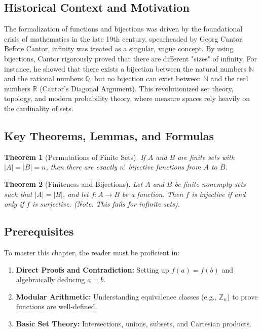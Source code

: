 \documentclass[11pt, a4paper]{article}
\newtheorem{theorem}{Theorem}[section]
\theoremstyle{definition}
\theoremstyle{remark}
\newcommand{\R}{\mathbb{R}}
\newcommand{\N}{\mathbb{N}}
\newcommand{\Z}{\mathbb{Z}}
\newcommand{\Q}{\mathbb{Q}}
\begin{document}
\subsection{Historical Context and Motivation}
The formalization of functions and bijections was driven by the foundational crisis of mathematics in the late 19th century, spearheaded by Georg Cantor. Before Cantor, infinity was treated as a singular, vague concept. By using bijections, Cantor rigorously proved that there are different "sizes" of infinity. For instance, he showed that there exists a bijection between the natural numbers $\N$ and the rational numbers $\Q$, but no bijection can exist between $\N$ and the real numbers $\R$ (Cantor's Diagonal Argument). This revolutionized set theory, topology, and modern probability theory, where measure spaces rely heavily on the cardinality of sets.

\subsection{Key Theorems, Lemmas, and Formulas}
\begin{theorem}[Permutations of Finite Sets]
If $A$ and $B$ are finite sets with $|A| = |B| = n$, then there are exactly $n!$ bijective functions from $A$ to $B$.
\end{theorem}

\begin{theorem}[Finiteness and Bijections]
Let $A$ and $B$ be finite nonempty sets such that $|A| = |B|$, and let $f: A \to B$ be a function. Then $f$ is injective if and only if $f$ is surjective. (Note: This fails for infinite sets).
\end{theorem}

\subsection{Prerequisites}
To master this chapter, the reader must be proficient in:
\begin{enumerate}
    \item \textbf{Direct Proofs and Contradiction:} Setting up $f(a) = f(b)$ and algebraically deducing $a = b$.
    \item \textbf{Modular Arithmetic:} Understanding equivalence classes (e.g., $\Z_n$) to prove functions are well-defined.
    \item \textbf{Basic Set Theory:} Intersections, unions, subsets, and Cartesian products.
\end{enumerate}
\end{document}

